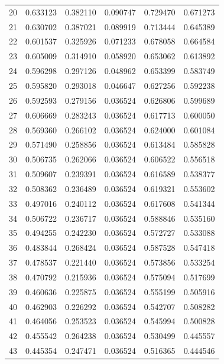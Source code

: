\documentclass[a4paper, 12pt]{article}
\begin{document}
\begin{tabularx}{\linewidth}{|X|X|X|X|X|X|}
        20 & 0.633123 & 0.382110 & 0.090747 & 0.729470 & 0.671273 \\
        21 & 0.630702 & 0.387021 & 0.089919 & 0.713444 & 0.645389 \\
        22 & 0.601537 & 0.325926 & 0.071233 & 0.678058 & 0.664584 \\
        23 & 0.605009 & 0.314910 & 0.058920 & 0.653062 & 0.613892 \\
        24 & 0.596298 & 0.297126 & 0.048962 & 0.653399 & 0.583749 \\
        25 & 0.595820 & 0.293018 & 0.046647 & 0.627256 & 0.592238 \\
        26 & 0.592593 & 0.279156 & 0.036524 & 0.626806 & 0.599689 \\
        27 & 0.606669 & 0.283243 & 0.036524 & 0.617713 & 0.600050 \\
        28 & 0.569360 & 0.266102 & 0.036524 & 0.624000 & 0.601084 \\
        29 & 0.571490 & 0.258856 & 0.036524 & 0.613484 & 0.585828 \\
        30 & 0.506735 & 0.262066 & 0.036524 & 0.606522 & 0.556518 \\
        31 & 0.509607 & 0.239391 & 0.036524 & 0.616589 & 0.538377 \\
        32 & 0.508362 & 0.236489 & 0.036524 & 0.619321 & 0.553602 \\
        33 & 0.497016 & 0.240112 & 0.036524 & 0.617608 & 0.541344 \\
        34 & 0.506722 & 0.236717 & 0.036524 & 0.588846 & 0.535160 \\
        35 & 0.494255 & 0.242230 & 0.036524 & 0.572727 & 0.533088 \\
        36 & 0.483844 & 0.268424 & 0.036524 & 0.587528 & 0.547418 \\
        37 & 0.478537 & 0.221440 & 0.036524 & 0.573856 & 0.533254 \\
        38 & 0.470792 & 0.215936 & 0.036524 & 0.575094 & 0.517699 \\
        39 & 0.460636 & 0.225875 & 0.036524 & 0.555199 & 0.505916 \\
        40 & 0.462903 & 0.226292 & 0.036524 & 0.542707 & 0.508282 \\
        41 & 0.464056 & 0.253523 & 0.036524 & 0.545994 & 0.500828 \\
        42 & 0.455542 & 0.264238 & 0.036524 & 0.530499 & 0.445557 \\
        43 & 0.445354 & 0.247471 & 0.036524 & 0.516365 & 0.444546 \\

\end{tabularx}
\end{document}
